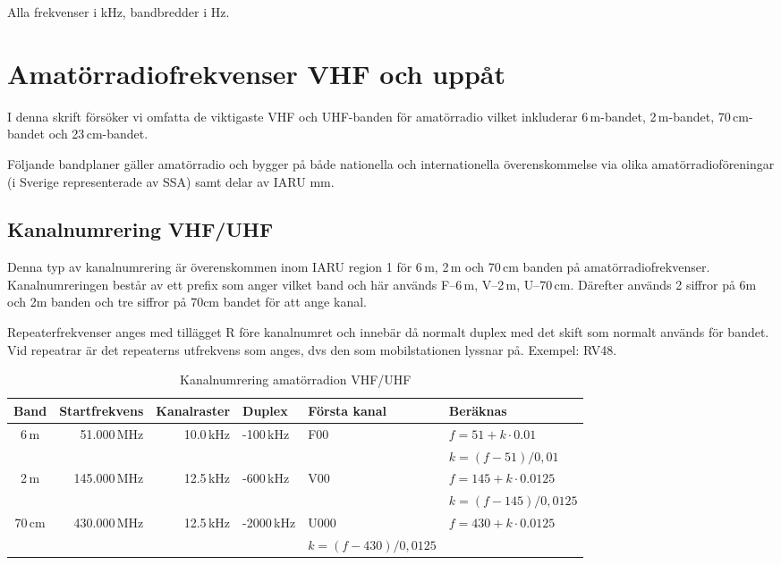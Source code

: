 {Alla frekvenser i kHz, bandbredder i Hz.




\section{Amatörradiofrekvenser VHF och uppåt}

I denna skrift försöker vi omfatta de viktigaste VHF och UHF-banden
för amatörradio vilket inkluderar 6\,m-bandet, 2\,m-bandet,
70\,cm-bandet och 23\,cm-bandet.

Följande bandplaner gäller amatörradio och bygger på både nationella och
internationella överenskommelse via olika amatörradioföreningar (i Sverige
representerade av SSA) samt delar av IARU mm.

\subsection{Kanalnumrering VHF/UHF}

Denna typ av kanalnumrering är överenskommen inom IARU region 1 för
6\,m, 2\,m och 70\,cm banden på
amatörradiofrekvenser. Kanalnumreringen består av ett prefix som anger
vilket band och här används F--6\,m, V--2\,m, U--70\,cm. Därefter
används 2 siffror på 6m och 2m banden och tre siffror på 70cm bandet
för att ange kanal.

Repeaterfrekvenser anges med tillägget R före kanalnumret och innebär
då normalt duplex med det skift som normalt används för bandet. Vid
repeatrar är det repeaterns utfrekvens som anges, dvs den som
mobilstationen lyssnar på. Exempel: RV48.

\begin{table}[h]
\centering
\begin{tabular}{crrlll}
	\textbf{Band} & \textbf{Startfrekvens} & \textbf{Kanalraster} & \textbf{Duplex} & \textbf{Första kanal} & \textbf{Beräknas}    \\ \hline
	    6\,m      &            51.000\,MHz &            10.0\,kHz & -100\,kHz       & F00                   & $f=51+k\cdot0.01$    \\
	              &                        &                      &                 &                       & $k=(f-51)/0,01$      \\ \hline
	    2\,m      &           145.000\,MHz &            12.5\,kHz & -600\,kHz       & V00                   & $f=145+k\cdot0.0125$ \\
	              &                        &                      &                 &                       & $k=(f-145)/0,0125$   \\ \hline
	   70\,cm     &           430.000\,MHz &            12.5\,kHz & -2000\,kHz      & U000                  & $f=430+k\cdot0.0125$ \\
	                                       &                      &                 &                       & $k=(f-430)/0,0125$   \\ \hline
\end{tabular}
\caption{Kanalnumrering amatörradion VHF/UHF}
\end{table}

}
